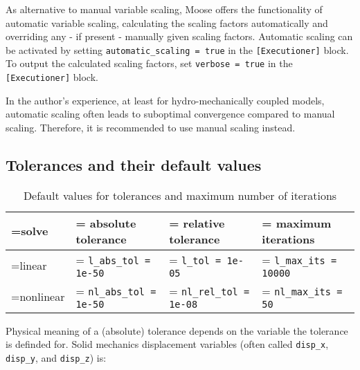 As alternative to manual variable scaling, Moose offers the functionality of
automatic variable scaling, calculating the scaling factors automatically and
overriding any - if present - manually given scaling factors. Automatic scaling
can be activated by setting \texttt{automatic\_scaling = true} in the
\texttt{[Executioner]} block. To output the calculated scaling factors, set
\texttt{verbose = true} in the \texttt{[Executioner]} block.

In the author's experience, at least for hydro-mechanically coupled models,
automatic scaling often leads to suboptimal convergence compared to manual
scaling. Therefore, it is recommended to use manual scaling instead.

\subsection{Tolerances and their default values}

\begin{table}[htbp]
  \centering
  \caption{Default values for tolerances and maximum number of iterations}
  \label{tab:tolerances}
  \begin{tabularx}{\textwidth}{
      >{\hsize\linewidth=\hsize}Y
      >{\hsize\linewidth=\hsize}Y
      >{\hsize\linewidth=\hsize}Y
      >{\hsize\linewidth=\hsize}Y}
    \hline
    solve     & absolute tolerance            & relative tolerance            & maximum iterations \\

    \hline

    linear    & \texttt{l\_abs\_tol = 1e-50}  & \texttt{l\_tol = 1e-05}       &
    \texttt{l\_max\_its = 10000}                                                                   \\

    nonlinear & \texttt{nl\_abs\_tol = 1e-50} & \texttt{nl\_rel\_tol = 1e-08} &
    \texttt{nl\_max\_its = 50}                                                                     \\

    \hline
  \end{tabularx}
\end{table}

Physical meaning of a (absolute) tolerance depends on the variable the
tolerance is definded for. Solid mechanics displacement variables (often called
\texttt{disp\_x}, \texttt{disp\_y}, and \texttt{disp\_z}) is:

